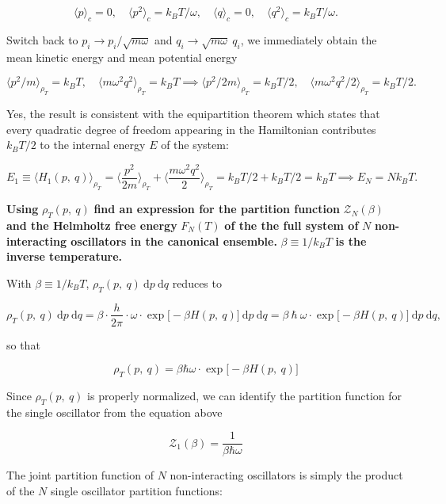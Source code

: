 \documentclass[11pt]{article}
\begin{document}
\[
\langle p \rangle_{c} = 0,\quad \langle p^{2} \rangle_{c} = k_{B} T / \omega, \quad \langle q \rangle_{c} = 0, \quad \langle q^{2} \rangle_{c} = k_{B} T / \omega.
\]

Switch back to \(p_i \rightarrow p_i / \sqrt{m\omega}\) and \(q_i \rightarrow \sqrt{m\omega}~q_i\), we immediately obtain the mean kinetic energy and mean potential energy

\[
\langle p^{2} / m \rangle_{\rho_{T}} = k_{B} T, \quad \langle m \omega^{2} q^{2} \rangle_{\rho_{T}} = k_{B} T \implies \langle p^{2} / 2m \rangle_{\rho_{T}} = k_{B} T/2, \quad \langle m \omega^{2} q^{2} /2 \rangle_{\rho_{T}} = k_{B} T /2.
\]

Yes, the result is consistent with the equipartition theorem which states that every quadratic degree of freedom appearing in the Hamiltonian contributes \(k_{B} T / 2\) to the internal energy \(E\) of the system:

\[
E_{1} \equiv \langle H_{1} (p,~q) \rangle_{\rho_{T}} = \bigg \langle \frac{p^2}{2 m} \bigg \rangle_{\rho_{T}} + \bigg \langle \frac{m \omega^2 q^2}{2} \bigg \rangle_{\rho_{T}} = k_{B} T / 2 + k_{B} T /2 = k_{B} T \implies E_{N} = N k_{B} T.
\]

\label{sec:org38abcc0}

\textbf{Using} \(\rho_{T} (p,~q)\) \textbf{find an expression for the partition function} \(\mathcal{Z}_{N}(\beta)\) \textbf{and the Helmholtz free energy} \(F_{N}(T)\) \textbf{of the the full system of} \(N\) \textbf{non-interacting oscillators in the canonical ensemble.} \(\beta \equiv 1 / k_{B} T\) \textbf{is the inverse temperature.}

With \(\beta \equiv 1/k_{B} T\), \(\rho_{T} (p,~q)~\mathrm{d}p~\mathrm{d} q\) reduces to

\[
\rho_{T} (p,~q)~\mathrm{d}p~\mathrm{d} q = \beta \cdot \frac{h}{2\pi} \cdot \omega \cdot \exp\big[- \beta H(p,~q)\big] ~\mathrm{d}p~\mathrm{d} q = \beta~\hbar~\omega \cdot \exp\big[- \beta H(p,~q)\big] ~\mathrm{d}p~\mathrm{d} q,
\]

so that

\[
\boxed{
\rho_{T} (p,~q) = \beta\hbar\omega \cdot \exp\big[- \beta H(p,~q)\big]
}
\]

Since \(\rho_{T} (p,~q)\) is properly normalized, we can identify the partition function for the single oscillator from the equation above

\[
\boxed{
\mathcal{Z}_{1} (\beta) = \frac{1}{\beta\hbar\omega}
}
\]

The joint partition function of \(N\) non-interacting oscillators is simply the product of the \(N\) single oscillator partition functions:
\end{document}
